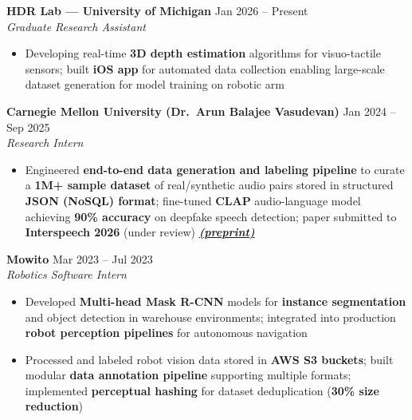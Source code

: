 \documentclass[9pt]{article}
\begin{document}
\vspace{-1mm}
\textbf{HDR Lab --- University of Michigan} \hfill Jan 2026 -- Present\\
\emph{Graduate Research Assistant}
\vspace{-2mm}
\begin{itemize}[leftmargin=*,noitemsep,topsep=1pt]
  \item Developing real-time \textbf{3D depth estimation} algorithms for visuo-tactile sensors; built \textbf{iOS app} for automated data collection enabling large-scale dataset generation for model training on robotic arm
\end{itemize}

\vspace{-1mm}
\textbf{Carnegie Mellon University (Dr.\ Arun Balajee Vasudevan)} \hfill Jan 2024 -- Sep 2025\\
\emph{Research Intern}
\vspace{-2mm}
\begin{itemize}[leftmargin=*,noitemsep,topsep=1pt]
  \item Engineered \textbf{end-to-end data generation and labeling pipeline} to curate a \textbf{1M+ sample dataset} of real/synthetic audio pairs stored in structured \textbf{JSON (NoSQL) format}; fine-tuned \textbf{CLAP} audio-language model achieving \textbf{90\% accuracy} on deepfake speech detection; paper submitted to \textbf{Interspeech 2026} (under review) \emph{\textbf{\href{https://drive.google.com/file/d/1hdSPxQQA-PKayYQPPESZb11ofm7XrQRX/view?usp=sharing}{(preprint)}}}
\end{itemize}

\vspace{-1mm}
\textbf{Mowito} \hfill Mar 2023 -- Jul 2023\\
\emph{Robotics Software Intern}
\vspace{-2mm}
\begin{itemize}[leftmargin=*,noitemsep,topsep=1pt]
  \item Developed \textbf{Multi-head Mask R-CNN} models for \textbf{instance segmentation} and object detection in warehouse environments; integrated into production \textbf{robot perception pipelines} for autonomous navigation
  \item Processed and labeled robot vision data stored in \textbf{AWS S3 buckets}; built modular \textbf{data annotation pipeline} supporting multiple formats; implemented \textbf{perceptual hashing} for dataset deduplication (\textbf{30\% size reduction})
\end{itemize}
\end{document}
